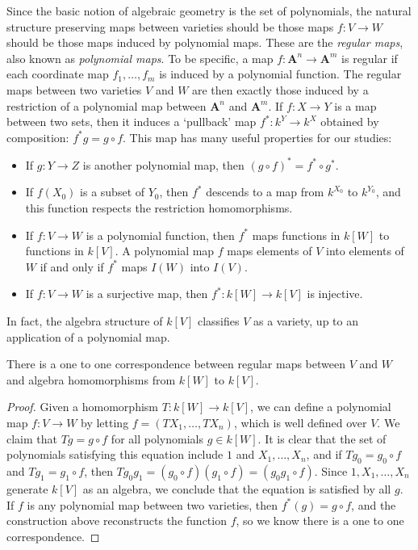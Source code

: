 Since the basic notion of algebraic geometry is the set of polynomials, the natural structure preserving maps between varieties should be those maps $f: V \to W$ should be those maps induced by polynomial maps. These are the \emph{regular maps}, also known as \emph{polynomial maps}. To be specific, a map $f: \mathbf{A}^n \to \mathbf{A}^m$ is regular if each coordinate map $f_1, \dots, f_m$ is induced by a polynomial function. The regular maps between two varieties $V$ and $W$ are then exactly those induced by a restriction of a polynomial map between $\mathbf{A}^n$ and $\mathbf{A}^m$. If $f: X \to Y$ is a map between two sets, then it induces a `pullback' map $f^*: k^Y \to k^X$ obtained by composition: $f^*g = g \circ f$. This map has many useful properties for our studies:
%
\begin{itemize}
    \item If $g: Y \to Z$ is another polynomial map, then $(g \circ f)^* = f^* \circ g^*$.
    \item If $f(X_0)$ is a subset of $Y_0$, then $f^*$ descends to a map from $k^{X_0}$ to $k^{Y_0}$, and this function respects the restriction homomorphisms.
    \item If $f: V \to W$ is a polynomial function, then $f^*$ maps functions in $k[W]$ to functions in $k[V]$. A polynomial map $f$ maps elements of $V$ into elements of $W$ if and only if $f^*$ maps $I(W)$ into $I(V)$.
    \item If $f: V \to W$ is a surjective map, then $f^*: k[W] \to k[V]$ is injective.
\end{itemize}
%
In fact, the algebra structure of $k[V]$ classifies $V$ as a variety, up to an application of a polynomial map.

\begin{prop}
    There is a one to one correspondence between regular maps between $V$ and $W$ and algebra homomorphisms from $k[W]$ to $k[V]$.
\end{prop}
\begin{proof}
    Given a homomorphism $T: k[W] \to k[V]$, we can define a polynomial map $f: V \to W$ by letting $f = (TX_1, \dots, TX_n)$, which is well defined over $V$. We claim that $Tg = g \circ f$ for all polynomials $g \in k[W]$. It is clear that the set of polynomials satisfying this equation include $1$ and $X_1, \dots, X_n$, and if $Tg_0 = g_0 \circ f$ and $Tg_1 = g_1 \circ f$, then $Tg_0g_1 = (g_0 \circ f)(g_1 \circ f) = (g_0g_1 \circ f)$. Since $1,X_1, \dots, X_n$ generate $k[V]$ as an algebra, we conclude that the equation is satisfied by all $g$. If $f$ is any polynomial map between two varieties, then $f^*(g) = g \circ f$, and the construction above reconstructs the function $f$, so we know there is a one to one correspondence.
\end{proof}

